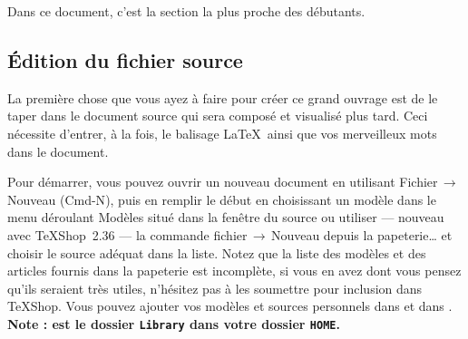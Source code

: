 \documentclass[11pt,french]{article}
\newcommand{\TS}{\textsf{\TeX Shop}}
\newcommand{\cmd}[1]{\textsf{#1}}
\newcommand{\mnu}[1]{\textsf{#1}}
\newcommand{\To}{\,\(\to\)\,}
\begin{document}
Dans ce document, c'est la section la plus proche des débutants.


    
\subsection{Édition du fichier source}

La première chose que vous ayez à faire pour créer ce grand ouvrage est de le taper dans le document source qui sera composé et visualisé plus tard. Ceci nécessite d'entrer, à la fois, le balisage \LaTeX\ ainsi que vos merveilleux mots dans le document.


Pour démarrer, vous pouvez ouvrir un nouveau document en utilisant \mnu{Fichier}\To\mnu{Nouveau} (\cmd{Cmd-N}), puis en remplir le début en choisissant un modèle dans le menu déroulant \mnu{Modèles} situé dans la fenêtre du source ou utiliser --- nouveau avec \TS\ 2.36 --- la commande \mnu{fichier}\To\mnu{Nouveau depuis la papeterie…} et choisir le source adéquat dans la liste. Notez que la liste des modèles et des articles fournis dans la papeterie est incomplète, si vous en avez dont vous pensez qu'ils seraient très utiles, n'hésitez pas à les soumettre pour inclusion dans \TS. Vous pouvez ajouter vos modèles et sources personnels dans  et dans . \textbf {Note :  est le dossier \texttt{Library} dans votre dossier \texttt{HOME}.}

\end{document}
